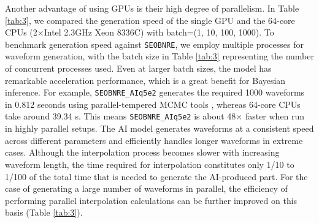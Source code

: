 \documentclass[
reprint,
superscriptaddress,
amsmath,amssymb,
aps,
prd,
floatfix,
]{revtex4-2}
\begin{document}
Another advantage of using GPUs is their high degree of parallelism. 
In Table \ref{tab:3}, we compared the generation speed of the single GPU and the 64-core CPUs (2$\times$Intel 2.3GHz Xeon 8336C) with batch=(1, 10, 100,  1000). 
To benchmark generation speed against \texttt{SEOBNRE}, we employ multiple processes for waveform generation, with the batch size in Table \ref{tab:3} representing the number of concurrent processes used. 
Even at larger batch sizes, the model has remarkable acceleration performance, which is a great benefit for Bayesian inference.
For example, \texttt{SEOBNRE\_AIq5e2} generates the required 1000 waveforms in 0.812 seconds using parallel-tempered MCMC tools \cite{littenbergBayesianApproachDetection2009a}, whereas 64-core CPUs take around 39.34 s. 
This means \texttt{SEOBNRE\_AIq5e2} is about 48$\times$ faster when run in highly parallel setups.
The AI model generates waveforms at a consistent speed across different parameters and efficiently handles longer waveforms in extreme cases. 
Although the interpolation process becomes slower with increasing waveform length, the time required for interpolation constitutes only 1/10 to 1/100 of the total time that is needed to generate the AI-produced part. 
For the case of generating a large number of waveforms in parallel, the efficiency of performing parallel interpolation calculations can be further improved on this basis (Table \ref{tab:3}).
\end{document}
